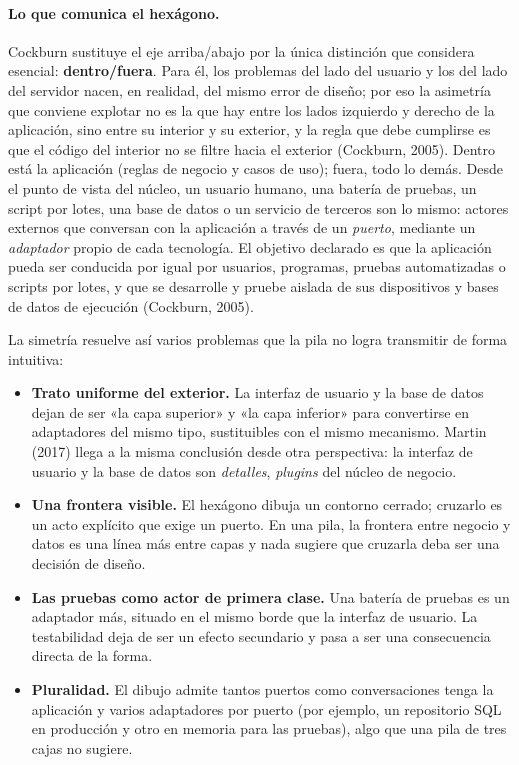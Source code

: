 \documentclass[11pt,a4paper]{article}
\begin{document}
\paragraph{Lo que comunica el hexágono.}
Cockburn sustituye el eje arriba/abajo por la única distinción que considera esencial:
\textbf{dentro/fuera}. Para él, los problemas del lado del usuario y los del lado del servidor
nacen, en realidad, del mismo error de diseño; por eso la asimetría que conviene explotar no es
la que hay entre los lados izquierdo y derecho de la aplicación, sino entre su interior y su
exterior, y la regla que debe cumplirse es que el código del interior no se filtre hacia el
exterior (Cockburn, 2005). Dentro está la aplicación (reglas de negocio y casos de uso); fuera,
todo lo demás. Desde el punto de vista del núcleo, un usuario humano, una batería de pruebas,
un script por lotes, una base de datos o un servicio de terceros son lo mismo: actores
externos que conversan con la aplicación a través de un \emph{puerto}, mediante un
\emph{adaptador} propio de cada tecnología. El objetivo declarado es que la aplicación pueda
ser conducida por igual por usuarios, programas, pruebas automatizadas o scripts por lotes, y
que se desarrolle y pruebe aislada de sus dispositivos y bases de datos de ejecución
(Cockburn, 2005).

La simetría resuelve así varios problemas que la pila no logra transmitir de forma intuitiva:

\begin{itemize}[leftmargin=1.4em]
\item \textbf{Trato uniforme del exterior.} La interfaz de usuario y la base de datos dejan de
ser «la capa superior» y «la capa inferior» para convertirse en adaptadores del mismo tipo,
sustituibles con el mismo mecanismo. Martin (2017) llega a la misma conclusión desde otra
perspectiva: la interfaz de usuario y la base de datos son \emph{detalles}, \emph{plugins} del
núcleo de negocio.
\item \textbf{Una frontera visible.} El hexágono dibuja un contorno cerrado; cruzarlo es un
acto explícito que exige un puerto. En una pila, la frontera entre negocio y datos es una
línea más entre capas y nada sugiere que cruzarla deba ser una decisión de diseño.
\item \textbf{Las pruebas como actor de primera clase.} Una batería de pruebas es un
adaptador más, situado en el mismo borde que la interfaz de usuario. La testabilidad deja de
ser un efecto secundario y pasa a ser una consecuencia directa de la forma.
\item \textbf{Pluralidad.} El dibujo admite tantos puertos como conversaciones tenga la
aplicación y varios adaptadores por puerto (por ejemplo, un repositorio SQL en producción y
otro en memoria para las pruebas), algo que una pila de tres cajas no sugiere.
\end{itemize}
\end{document}
